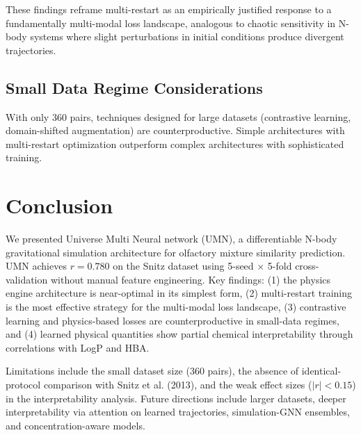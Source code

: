 \documentclass[11pt,a4paper]{article}
\begin{document}
These findings reframe multi-restart as an empirically justified response to a fundamentally multi-modal loss landscape, analogous to chaotic sensitivity in N-body systems where slight perturbations in initial conditions produce divergent trajectories.

\subsection{Small Data Regime Considerations}
With only 360 pairs, techniques designed for large datasets (contrastive learning, domain-shifted augmentation) are counterproductive. Simple architectures with multi-restart optimization outperform complex architectures with sophisticated training.

\section{Conclusion}

We presented Universe Multi Neural network (UMN), a differentiable N-body gravitational simulation architecture for olfactory mixture similarity prediction. UMN achieves $r = 0.780$ on the Snitz dataset using 5-seed $\times$ 5-fold cross-validation without manual feature engineering. Key findings: (1) the physics engine architecture is near-optimal in its simplest form, (2) multi-restart training is the most effective strategy for the multi-modal loss landscape, (3) contrastive learning and physics-based losses are counterproductive in small-data regimes, and (4) learned physical quantities show partial chemical interpretability through correlations with LogP and HBA.

Limitations include the small dataset size (360 pairs), the absence of identical-protocol comparison with Snitz et al. (2013), and the weak effect sizes ($|r| < 0.15$) in the interpretability analysis. Future directions include larger datasets, deeper interpretability via attention on learned trajectories, simulation-GNN ensembles, and concentration-aware models.
\end{document}
